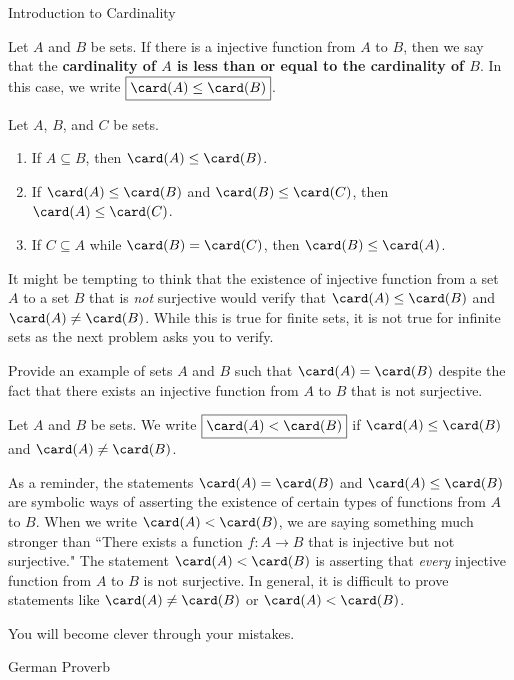 \begin{section}{Introduction to Cardinality}
\begin{definition}
Let $A$ and $B$ be sets. If there is a injective function from $A$ to $B$, then we say that the \textbf{cardinality of $A$ is less than or equal to the cardinality of $B$}. In this case, we write $\boxed{\card(A)\leq\card(B)}$.
\end{definition}

\begin{theorem}
Let $A$, $B$, and $C$ be sets.
\begin{enumerate}[label=\textrm{(\alph*)}]
\item If $A\subseteq B$, then $\card(A)\leq \card(B)$.
\item If $\card(A)\leq \card(B)$ and $\card(B)\leq \card(C)$, then $\card(A)\leq \card(C)$.
\item If $C\subseteq A$ while $\card(B)=\card(C)$, then $\card(B)\leq \card(A)$.
\end{enumerate}
\end{theorem}

It might be tempting to think that the existence of injective function from a set $A$ to a set $B$ that is \emph{not} surjective would verify that $\card(A)\leq \card(B)$ and $\card(A)\neq \card(B)$. While this is true for finite sets, it is not true for infinite sets as the next problem asks you to verify.

\begin{problem}
Provide an example of sets $A$ and $B$ such that $\card(A)=\card(B)$ despite the fact that there exists an injective function from $A$ to $B$ that is not surjective.
\end{problem}

\begin{definition}
Let $A$ and $B$ be sets. We write $\boxed{\card(A)< \card(B)}$ if $\card(A)\leq \card(B)$ and $\card(A)\neq \card(B)$.
\end{definition}

As a reminder, the statements $\card(A)= \card(B)$ and $\card(A)\leq \card(B)$ are symbolic ways of asserting the existence of certain types of functions from $A$ to $B$. When we write $\card(A)<\card(B)$, we are saying something much stronger than ``There exists a function $f:A\to B$ that is injective but not surjective." The statement $\card(A)<\card(B)$ is asserting that \emph{every} injective function from $A$ to $B$ is not surjective. In general, it is difficult to prove statements like $\card(A)\neq \card(B)$ or $\card(A)<\card(B)$.

\epigraph{You will become clever through your mistakes.}{German Proverb}

\end{section}